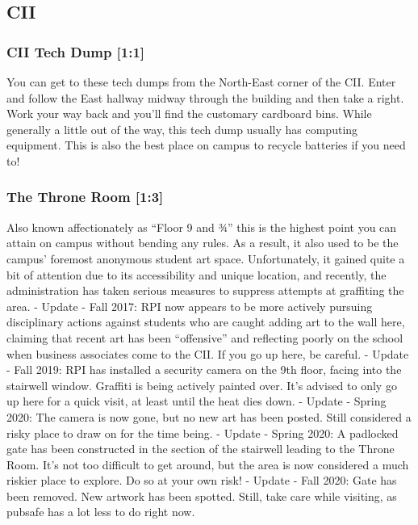 \documentclass{article}
\begin{document}
\pagebreak
\subsection{CII}
\subsubsection{CII Tech Dump [1:1]}
You can get to these tech dumps from the North-East corner of the CII. Enter and follow the East hallway midway through the building and then take a right. Work your way back and you’ll find the customary cardboard bins. While generally a little out of the way, this tech dump usually has computing equipment. This is also the best place on campus to recycle batteries if you need to!
 \subsubsection{The Throne Room [1:3]}
Also known affectionately as “Floor 9 and 3⁄4” this is the highest point you can attain on campus without bending any rules. As a result, it also used to be the campus’ foremost anonymous student art space. Unfortunately, it gained quite a bit of attention due to its accessibility and unique location, and recently, the administration has taken serious measures to suppress attempts at graffiting the area.
- Update - Fall 2017: RPI now appears to be more actively pursuing disciplinary actions against students who are caught adding art to the wall here, claiming that recent art has been “offensive” and reflecting poorly on the school when business associates come to the CII. If you go up here, be careful.
- Update - Fall 2019: RPI has installed a security camera on the 9th floor, facing into the stairwell window. Graffiti is being actively painted over. It’s advised to only go up here for a quick visit, at least until the heat dies down.
- Update - Spring 2020: The camera is now gone, but no new art has been posted. Still considered a risky place to draw on for the time being.
- Update - Spring 2020: A padlocked gate has been constructed in the section of the stairwell leading to the Throne Room. It’s not too difficult to get around, but the area is now considered a much riskier place to explore. Do so at your own risk!
- Update - Fall 2020: Gate has been removed. New artwork has been spotted. Still, take care while visiting, as pubsafe has a lot less to do right now.
\end{document}
